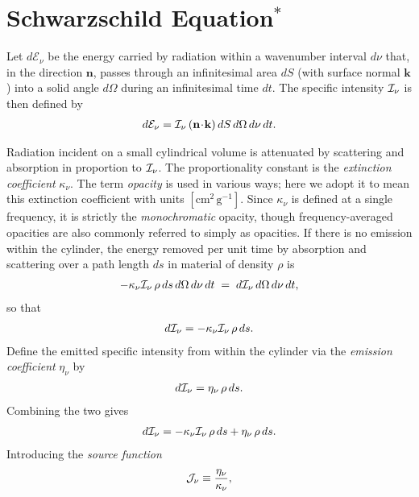 \section{Schwarzschild Equation$^\ast$}

Let $d\mathcal{E}_\nu$ be the energy carried by radiation within a wavenumber interval $d\nu$ that, in the direction $\mathbf{n}$, passes through an infinitesimal area $dS$ (with surface normal $\mathbf{k}$) into a solid angle $d\Omega$ during an infinitesimal time $dt$. The specific intensity ${\mathcal{I}_\nu}$ is then defined by
\begin{align}
d \mathcal{E}_\nu = {\mathcal{I}_\nu} \, (\mathbf{n}\!\cdot\!\mathbf{k}) \, dS \, d\Omega \, d\nu \, dt .
\end{align}

Radiation incident on a small cylindrical volume is attenuated by scattering and absorption in proportion to ${\mathcal{I}_\nu}$. The proportionality constant is the \emph{extinction coefficient}  $\kappa_\nu$. The term \emph{opacity}  is used in various ways; here we adopt it to mean this extinction coefficient with units $[\mathrm{cm^2\,g^{-1}}]$. Since $\kappa_\nu$ is defined at a single frequency, it is strictly the \emph{monochromatic} opacity, though frequency-averaged opacities are also commonly referred to simply as opacities. If there is no emission within the cylinder, the energy removed per unit time by absorption and scattering over a path length $ds$ in material of density $\rho$ is
\begin{align}
- \kappa_\nu {\mathcal{I}_\nu} \, \rho \, ds \, d\Omega \, d\nu \, dt \;=\; d{\mathcal{I}_\nu} \, d\Omega \, d\nu \, dt ,
\end{align}
so that
\begin{align}
d {\mathcal{I}_\nu} = - \kappa_\nu {\mathcal{I}_\nu} \, \rho \, ds .
\end{align}
Define the emitted specific intensity from within the cylinder via the \emph{emission coefficient}  $\eta_\nu$ by
\begin{align}
d {\mathcal{I}_\nu} = \eta_\nu \, \rho \, ds .
\end{align}
Combining the two gives
\begin{align}
d {\mathcal{I}_\nu} = - \kappa_\nu {\mathcal{I}_\nu} \, \rho \, ds + \eta_\nu \, \rho \, ds .
\end{align}
Introducing the \emph{source function} 
\begin{align}
{\mathcal{J}_\nu} \equiv \frac{\eta_\nu}{\kappa_\nu} ,
\end{align}
